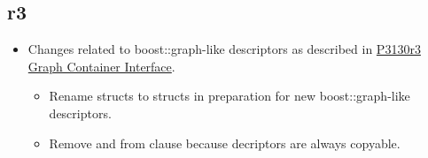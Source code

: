 \subsection*{\paperno r3}

\begin{itemize}
      \item Changes related to boost::graph-like descriptors as described in \href{https://www.wg21.link/P3130r3}{P3130r3 Graph Container Interface}.
      \begin{itemize}
            \item Rename  structs to  structs in preparation for new boost::graph-like descriptors.
            \item Remove  and  from   clause 
                  because decriptors are always copyable.
      \end{itemize}
      
\end{itemize}
